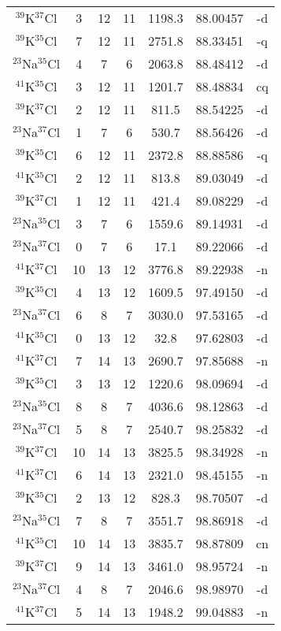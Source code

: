\begin{table*}[htp]
\begin{tabular}{ccccccc}
$^{39}$K$^{37}$Cl & 3 & 12 & 11 & 1198.3 & 88.00457 & -d \\
$^{39}$K$^{35}$Cl & 7 & 12 & 11 & 2751.8 & 88.33451 & -q \\
$^{23}$Na$^{35}$Cl & 4 & 7 & 6 & 2063.8 & 88.48412 & -d \\
$^{41}$K$^{35}$Cl & 3 & 12 & 11 & 1201.7 & 88.48834 & cq \\
$^{39}$K$^{37}$Cl & 2 & 12 & 11 & 811.5 & 88.54225 & -d \\
$^{23}$Na$^{37}$Cl & 1 & 7 & 6 & 530.7 & 88.56426 & -d \\
$^{39}$K$^{35}$Cl & 6 & 12 & 11 & 2372.8 & 88.88586 & -q \\
$^{41}$K$^{35}$Cl & 2 & 12 & 11 & 813.8 & 89.03049 & -d \\
$^{39}$K$^{37}$Cl & 1 & 12 & 11 & 421.4 & 89.08229 & -d \\
$^{23}$Na$^{35}$Cl & 3 & 7 & 6 & 1559.6 & 89.14931 & -d \\
$^{23}$Na$^{37}$Cl & 0 & 7 & 6 & 17.1 & 89.22066 & -d \\
$^{41}$K$^{37}$Cl & 10 & 13 & 12 & 3776.8 & 89.22938 & -n \\
$^{39}$K$^{35}$Cl & 4 & 13 & 12 & 1609.5 & 97.49150 & -d \\
$^{23}$Na$^{37}$Cl & 6 & 8 & 7 & 3030.0 & 97.53165 & -d \\
$^{41}$K$^{35}$Cl & 0 & 13 & 12 & 32.8 & 97.62803 & -d \\
$^{41}$K$^{37}$Cl & 7 & 14 & 13 & 2690.7 & 97.85688 & -n \\
$^{39}$K$^{35}$Cl & 3 & 13 & 12 & 1220.6 & 98.09694 & -d \\
$^{23}$Na$^{35}$Cl & 8 & 8 & 7 & 4036.6 & 98.12863 & -d \\
$^{23}$Na$^{37}$Cl & 5 & 8 & 7 & 2540.7 & 98.25832 & -d \\
$^{39}$K$^{37}$Cl & 10 & 14 & 13 & 3825.5 & 98.34928 & -n \\
$^{41}$K$^{37}$Cl & 6 & 14 & 13 & 2321.0 & 98.45155 & -n \\
$^{39}$K$^{35}$Cl & 2 & 13 & 12 & 828.3 & 98.70507 & -d \\
$^{23}$Na$^{35}$Cl & 7 & 8 & 7 & 3551.7 & 98.86918 & -d \\
$^{41}$K$^{35}$Cl & 10 & 14 & 13 & 3835.7 & 98.87809 & cn \\
$^{39}$K$^{37}$Cl & 9 & 14 & 13 & 3461.0 & 98.95724 & -n \\
$^{23}$Na$^{37}$Cl & 4 & 8 & 7 & 2046.6 & 98.98970 & -d \\
$^{41}$K$^{37}$Cl & 5 & 14 & 13 & 1948.2 & 99.04883 & -n \\

\end{tabular}
\end{table*}
